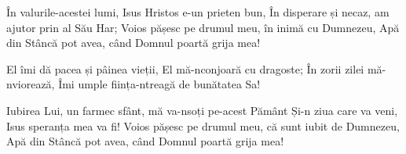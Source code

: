\beginverse
În valurile-acestei lumi, Isus Hristos e-un prieten bun,
În disperare și necaz, am ajutor prin al Său Har;
Voios pășesc pe drumul meu, în inimă cu Dumnezeu,
Apă din Stâncă pot avea, când Domnul poartă grija mea!
\endverse

\beginchorus
El îmi dă pacea și pâinea vieții,
El mă-nconjoară cu dragoste;
În zorii zilei mă-nviorează,
Îmi umple ființa-ntreagă de bunătatea Sa!
\endchorus

\beginverse
Iubirea Lui, un farmec sfânt, mă va-nsoți pe-acest Pământ
Și-n ziua care va veni, Isus speranța mea va fi!
Voios pășesc pe drumul meu, că sunt iubit de Dumnezeu,
Apă din Stâncă pot avea, când Domnul poartă grija mea!
\endverse
\endsong